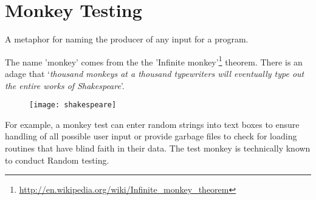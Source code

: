 \section{Monkey Testing}
\label{sec:Monkey Testing}

A metaphor for naming the producer of any input for a program.

The name 'monkey' comes from the the 'Infinite monkey'\footnote{\url{http://en.wikipedia.org/wiki/Infinite_monkey_theorem}} theorem. There is an adage that ‘\textit{thousand monkeys at a thousand typewriters will eventually type out the entire works of Shakespeare}’.

\begin{figure}[!h]
\centering
\texttt{[image: shakespeare]}
\caption{}
\label{fig:shakespeare}
\end{figure}

For example, a monkey test can enter random strings into text boxes to ensure handling of all possible user input or provide garbage files to check for loading routines that have blind faith in their data. The test monkey is technically known to conduct Random testing.